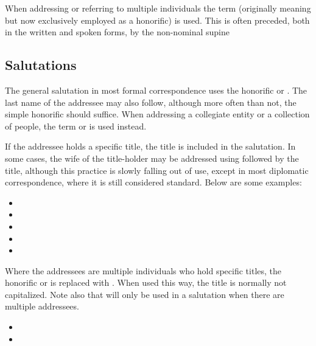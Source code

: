 When addressing or referring to multiple individuals the term  (originally meaning 
but now exclusively employed as a honorific) is used. This is often preceded, both in the written and spoken forms,
by the non-nominal supine 

\subsection{Salutations}

The general salutation in most formal correspondence uses the honorific  or .
The last name of the addressee may also follow, although more often than not, the simple honorific 
should suffice. When addressing a collegiate entity or a collection of people, the term  or
 is used instead.

If the addressee holds a specific title, the title is included in the salutation. In some cases, the wife of the
title-holder may be addressed using  followed by the title, although this practice is slowly falling out
of use, except in most diplomatic correspondence, where it is still considered standard. Below are some examples:


\begin{itemize}[nosep]
	\item {}
	\item {}
	\item {}
	\item {}
	\item {}
\end{itemize}

Where the addressees are multiple individuals who hold specific titles, the honorific  or  is replaced with . When used this way, the title is normally not capitalized. Note also that  will only be used in a salutation when there are multiple addressees.

\begin{itemize}[nosep]
	\item {}
	\item {}
\end{itemize}

